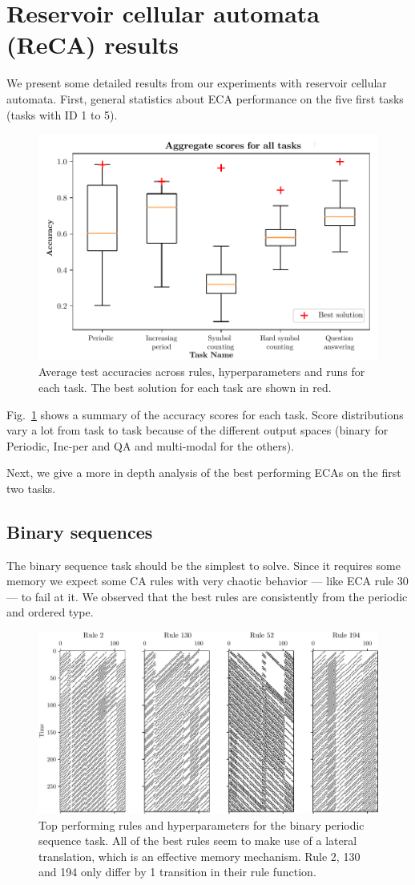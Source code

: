 \section{Reservoir cellular automata (ReCA) results}
We present some detailed results from our experiments with reservoir cellular
automata. First, general statistics about \ac{ECA} performance on the five first
tasks (tasks with ID 1 to 5).

\begin{figure}[htbp]
  \centering
  \includegraphics[width=.6\linewidth]{figures/aggregate_results.pdf}
  \caption{Average test accuracies across rules, hyperparameters and runs for
    each task. The best solution for each task are shown in
    red.}\label{fig:aggregate-results}
\end{figure}

Fig.~\ref{fig:aggregate-results} shows a summary of the accuracy scores for each
task. Score distributions vary a lot from task to task because of the different
output spaces (binary for Periodic, Inc-per and QA and multi-modal for the
others).

Next, we give a more in depth analysis of the best performing \acp{ECA} on the
first two tasks.

\subsection{Binary sequences}

The binary sequence task should be the simplest to solve. Since it requires some
memory we expect some CA rules with very chaotic behavior --- like ECA rule 30
--- to fail at it. We observed that the best rules are consistently from the
periodic and ordered type.

\begin{figure}[htbp]
  \centering
  \includegraphics[width=.6\linewidth]{figures/periodic_top.pdf}
  \caption{Top performing rules and hyperparameters for the binary periodic
    sequence task. All of the best rules seem to make use of a lateral
    translation, which is an effective memory mechanism. Rule 2, 130 and 194
    only differ by 1 transition in their rule
    function.}\label{fig:top-binary-seq}
\end{figure}

